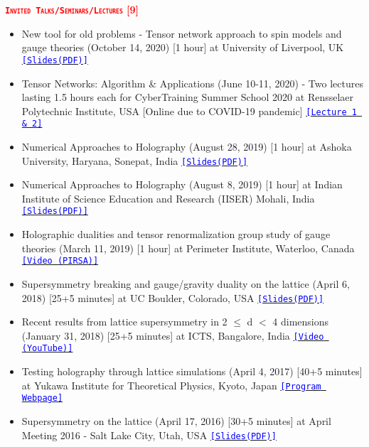 \renewcommand\ttdefault{cmvtt}
\textcolor{red}{\textbf{\textsc{\fontsize{11}{48} \bfseries \texttt{Invited Talks/Seminars/Lectures} [9]}}}

\begin{itemize}
 \item New tool for old problems - Tensor network approach to spin models and gauge theories 
 (October 14, 2020) [1 hour] at University of Liverpool, UK
 \href{http://raghavgjha.net/wp-content/uploads/2020/10/Seminar_v2.pdf}{{\texttt{\textcolor{blue}{[Slides(PDF)]}}}} 
 \item Tensor Networks: Algorithm \& Applications (June 10-11, 2020) - Two lectures lasting 1.5 hours each for 
 CyberTraining Summer School 2020 at Rensselaer Polytechnic Institute, USA [Online due to COVID-19 pandemic] 
 \href{http://raghavgjha.net/wp-content/uploads/2020/06/RPI_Summer_School2020.pdf}{{\texttt{\textcolor{blue}{[Lecture 1 \& 2]}}}} 
 \item Numerical Approaches to Holography (August 28, 2019) [1 hour] at Ashoka University, Haryana, Sonepat, India
 \href{http://raghavgjha.net/wp-content/uploads/2019/08/Talk_v1.pdf}{{\texttt{\textcolor{blue}{[Slides(PDF)]}}}} 
 \item Numerical Approaches to Holography (August 8, 2019) [1 hour] at Indian Institute of Science Education and Research (IISER) Mohali, India  
 \href{http://raghavgjha.net/wp-content/uploads/2019/08/Talk_iiser-1.pdf}{{\texttt{\textcolor{blue}{[Slides(PDF)]}}}} 
  \item Holographic dualities and tensor renormalization group study of gauge theories (March 11, 2019) [1 hour] at Perimeter Institute, Waterloo, Canada 
  \href{http://www.perimeterinstitute.ca/videos/interdisciplinary-seminar-holographic-dualities-and-tensor-renormalization-group-study-gauge}
{{\texttt{\textcolor{blue}{[Video (PIRSA)]}}}} 
  \item Supersymmetry breaking and gauge/gravity duality on the lattice (April 6, 2018) [25+5 minutes] at UC Boulder, Colorado, USA \href{[http://www-hep.colorado.edu/~eneil/lbsm18/talks/Jha.pdf]}{{\texttt{\textcolor{blue}{[Slides(PDF)]}}}} 
  \item Recent results from lattice supersymmetry in 2 $\le$ d $<$ 4 dimensions (January 31, 2018) [25+5 minutes] at ICTS, Bangalore, India \href{https://www.youtube.com/watch?v=Zey6DAEiw0c}{{\texttt{\textcolor{blue}{[Video (YouTube)]}}}} 
 \item Testing holography through lattice simulations (April 4, 2017) [40+5 minutes]  at Yukawa Institute for Theoretical Physics, Kyoto, Japan
 \href{https://sites.google.com/site/kyotoquantumgravity2017/home/program}{{\texttt{\textcolor{blue}{[Program Webpage]}}}}
\item Supersymmetry on the lattice (April 17, 2016) [30+5 minutes]  at April Meeting 2016 - Salt Lake City, Utah, USA
\href{https://absuploads.aps.org/presentation.cfm?pid=11807}{{\texttt{\textcolor{blue}{[Slides(PDF)]}}}} 
\end{itemize}
  
